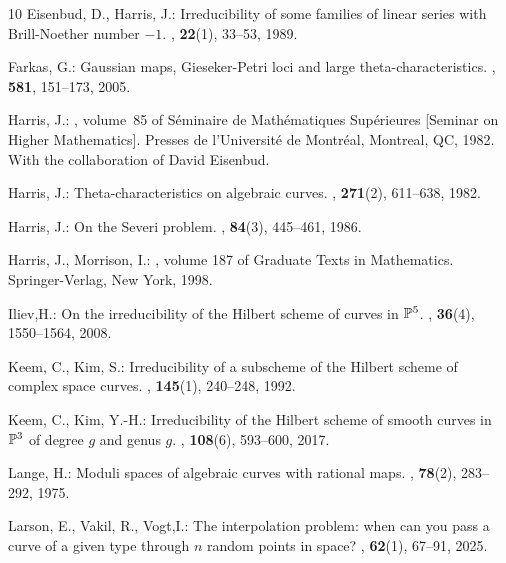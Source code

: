 \documentclass[11pt]{amsart}
\theoremstyle{definition}
\theoremstyle{definition}
\begin{document}
\begin{thebibliography}{10}
	Eisenbud, D., Harris, J.:
	\newblock Irreducibility of some families of linear series with
	{B}rill-{N}oether number {$-1$}.
	, \textbf{22}(1), 33--53, 1989.
	
	Farkas, G.:
	\newblock Gaussian maps, {G}ieseker-{P}etri loci and large
	theta-characteristics.
	, \textbf{581}, 151--173, 2005.
	
	Harris, J.:
	, volume~85 of {S\'eminaire de
		Math\'ematiques Sup\'erieures [Seminar on Higher Mathematics]}.
	\newblock Presses de l'Universit\'e{} de Montr\'eal, Montreal, QC, 1982.
	\newblock With the collaboration of David Eisenbud.
	
	Harris, J.:
	\newblock Theta-characteristics on algebraic curves.
	, \textbf{271}(2), 611--638, 1982.
	
	Harris, J.:
	\newblock On the {S}everi problem.
	, \textbf{84}(3), 445--461, 1986.
	
	Harris, J., Morrison, I.:
	, volume 187 of {Graduate Texts in
		Mathematics}.
	\newblock Springer-Verlag, New York, 1998.
	
	Iliev,H.:
	\newblock On the irreducibility of the {H}ilbert scheme of curves in {$\Bbb
		P^5$}.
	, \textbf{36}(4), 1550--1564, 2008.
	
	
	Keem, C., Kim, S.:
	\newblock Irreducibility of a subscheme of the {H}ilbert scheme of complex
	space curves.
	, \textbf{145}(1), 240--248, 1992.
	
	Keem, C., Kim, Y.-H.:
	\newblock Irreducibility of the {H}ilbert scheme of smooth curves in
	{$\Bbb{P}^3$} of degree {$g$} and genus {$g$}.
	, \textbf{108}(6), 593--600, 2017.
	
	Lange, H.:
	\newblock Moduli spaces of algebraic curves with rational maps.
	, \textbf{78}(2), 283--292, 1975.
	
	Larson, E., Vakil, R., Vogt,I.:
	\newblock The interpolation problem: when can you pass a curve of a given type
	through {$n$} random points in space?
	, \textbf{62}(1), 67--91, 2025.
	

\end{thebibliography}
\end{document}
